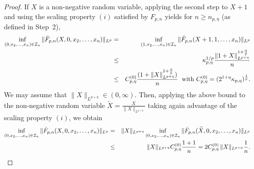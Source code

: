 \begin{proof}
  If $X$ is a non-negative random variable, applying the second step to $X+1$ and using the scaling property $(i)$ satisfied by $F_{p,n}$ yields for $n\ge  n_{p,\eta}$ (as defined in Step~2), 
\begin{eqnarray*} 
 \inf_{ (0,x_2,\ldots,x_n)\in {\cal I}_n}\|\bar F_{p,n}(X,0,x_2,\ldots,x_n)\|_{L^p} &=& \inf_{ (1,x_2,\ldots,x_n)\in {\cal I}_n}\|\bar F_{p,n}(X+1,1,\ldots,x_n)\|_{L^p} \\
 &\le&  \kappa^{1/p}_{p,\eta}\frac{\|1+X\|_{L^{p+\eta}}^{1+\frac{\eta}{p}}}{n}\\
 &\le&  C^{(0)}_{p,\eta}\frac{(1+ \|X\|_{L^{p+\eta}}^{1+\frac{\eta}{p}})}{n}\; \mbox{ with } C^{(0)}_{p,\eta}= (2^{1+\eta}\kappa_{p,\eta})^{\frac 1p}.
 \end{eqnarray*}
 We may assume that $\|X\|_{L^{p+\eta}}\!\in(0,\infty)$. Then, applying the above bound to the non-negative random variable $\widetilde X= \frac{X}{\|X\|_{L^{p+\eta}}}$ taking again advantage of the scaling property $(i)$, we obtain
 \begin{eqnarray*}
  \inf_{ (0,x_2,\ldots,x_n)\in {\cal I}_n}\|\bar
  F_{p,n}(X,0,x_2,\ldots,x_n)\|_{L^p}&=&  \|X\|_{L^{p+\eta}} \inf_{
  (0,x_2,\ldots,x_n)\in {\cal I}_n}\|\bar F_{p,n}(\widetilde
  X,0,x_2,\ldots,x_n)\|_{L^p}\\  &\le & \|X\|_{L^{p+\eta}}
  C^{(0)}_{p,\eta}\frac{1+1}{n} = 2C^{(0)}_{p,\eta}
  \,\|X\|_{L^{p+\eta}} \frac{1}{n}.
 \end{eqnarray*}
%
 

\end{proof}
